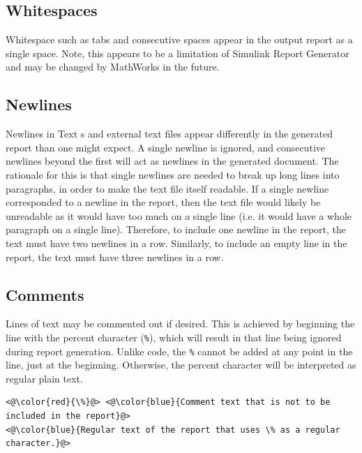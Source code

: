 \documentclass{article}
\begin{document}
\subsection{Whitespaces}
Whitespace such as tabs and consecutive spaces appear in the output report as a single space. Note, this appears to be a limitation of Simulink Report Generator and may be changed by MathWorks in the future.

\subsection{Newlines}
Newlines in Text s and external text files appear differently in the generated report than one might expect. A single newline is ignored, and consecutive newlines beyond the first will act as newlines in the generated document. 
The rationale for this is that single newlines are needed to break up long lines into paragraphs, in order to make the text file itself readable. If a single newline corresponded to a newline in the report, then the text file would likely be unreadable as it would have too much on a single line (i.e. it would have a whole paragraph on a single line). Therefore, to include one newline in the report, the text must have two newlines in a row. Similarly, to include an empty line in the report, the text must have three newlines in a row.

\subsection{Comments}
Lines of text may be commented out if desired. This is achieved by beginning the line with the percent character (\verb|%|), which will result in that line being ignored during report generation. Unlike \matlab code, the \verb|%|
cannot be added at any point in the line, just at the beginning. Otherwise, the percent character will be interpreted as regular plain text.

\begin{lstlisting}
<@\color{red}{\%}@> <@\color{blue}{Comment text that is not to be included in the report}@>
<@\color{blue}{Regular text of the report that uses \% as a regular character.}@>
\end{lstlisting}
\end{document}

